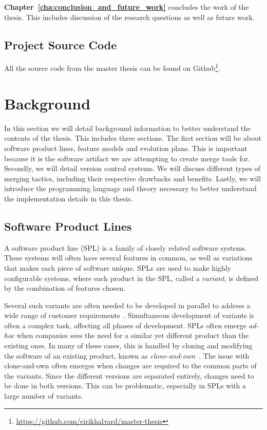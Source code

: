 \documentclass[a4paper,english]{ifimaster}
\begin{document}
\textbf{Chapter~\ref{cha:conclusion_and_future_work}} concludes the work of the thesis. This includes discussion of the research questions as well as future work.

\section{Project Source Code}%
\label{sec:project_source_code}

All the source code from the master thesis can be found on Github\footnote{\url{https://github.com/eirikhalvard/master-thesis}}.

\chapter{Background}%
\label{cha:background}

In this section we will detail background information to better understand the contents of the thesis. This includes three sections. The first section will be about software product lines, feature models and evolution plans. This is important because it is the software artifact we are attempting to create merge tools for. Secondly, we will detail version control systems. We will discuss different types of merging tactics, including their respective drawbacks and benefits. Lastly, we will introduce the programming language and theory necessary to better understand the implementation details in this thesis.

\section{Software Product Lines}%
\label{sec:software_product_lines}

A software product line (SPL) is a family of closely related software systems. These systems will often have several features in common, as well as variations that makes each piece of software unique. SPLs are used to make highly configurable systems, where each product in the SPL, called a \textit{variant}, is defined by the combination of features chosen.


Several such variants are often needed to be developed in parallel to address a wide range of customer requirements~\cite{cite:software_diversity_ina}. Simultaneous development of variants is often a complex task, affecting all phases of development. SPLs often emerge \textit{ad-hoc} when companies sees the need for a similar yet different product than the existing ones. In many of these cases, this is handled by cloning and modifying the software of an existing product, known as \textit{clone-and-own}~\cite{cite:clone_and_own}. The issue with clone-and-own often emerges when changes are required to the common parts of the variants. Since the different versions are separated entirely, changes need to be done in both versions. This can be problematic, especially in SPLs with a large number of variants.
\end{document}
